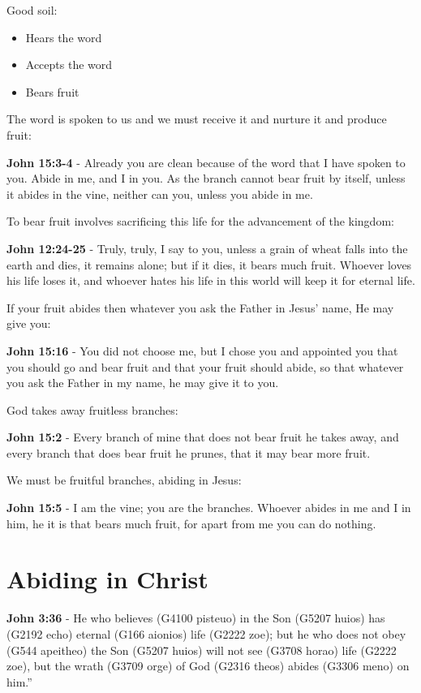 \documentclass[11pt]{article}
\begin{document}
Good soil:
\begin{itemize}
\item Hears the word
\item Accepts the word
\item Bears fruit
\end{itemize}

The word is spoken to us and we must receive it and nurture it and produce fruit:

\textbf{John 15:3-4} - Already you are clean because of the word that I have spoken to you. Abide in me, and I in you. As the branch cannot bear fruit by itself, unless it abides in the vine, neither can you, unless you abide in me.

To bear fruit involves sacrificing this life for the advancement of the kingdom:

\textbf{John 12:24-25} - Truly, truly, I say to you, unless a grain of wheat falls into the earth and dies, it remains alone; but if it dies, it bears much fruit. Whoever loves his life loses it, and whoever hates his life in this world will keep it for eternal life.

If your fruit abides then whatever you ask the Father in Jesus' name, He may give you:

\textbf{John 15:16} - You did not choose me, but I chose you and appointed you that you should go and bear fruit and that your fruit should abide, so that whatever you ask the Father in my name, he may give it to you.

God takes away fruitless branches:

\textbf{John 15:2} - Every branch of mine that does not bear fruit he takes away, and every branch that does bear fruit he prunes, that it may bear more fruit.

We must be fruitful branches, abiding in Jesus:

\textbf{John 15:5} - I am the vine; you are the branches. Whoever abides in me and I in him, he it is that bears much fruit, for apart from me you can do nothing.

\section{Abiding in Christ}
\label{sec:orgbe9815f}
\textbf{John 3:36} - He who believes (G4100 pisteuo) in the Son (G5207 huios) has (G2192 echo) eternal (G166 aionios) life (G2222 zoe); but he who does not obey (G544 apeitheo) the Son (G5207 huios) will not see (G3708 horao) life (G2222 zoe), but the wrath (G3709 orge) of God (G2316 theos) abides (G3306 meno) on him.”
\end{document}
